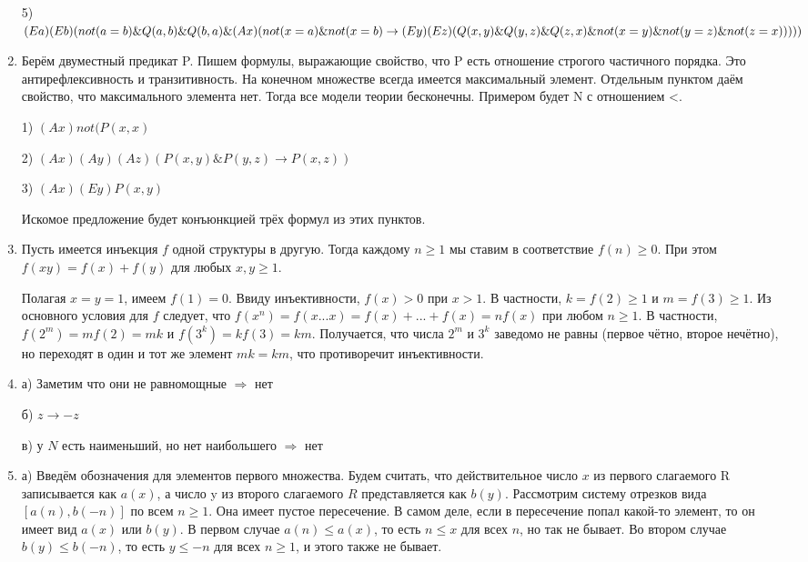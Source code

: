 \documentclass[11pt]{article}
\begin{document}
\begin{enumerate}
		5) $(Ea)(Eb)(not(a=b) \& Q(a,b) \& Q(b,a) \& (Ax)(not(x=a)\& not(x=b) \to \\ (Ey)(Ez)(Q(x,y)\& Q(y,z)\& Q(z,x)\& not(x=y)\& not(y=z)\& not(z=x)))))$
		
		\item Берём двуместный предикат P. Пишем формулы, выражающие свойство, что P есть отношение строгого частичного порядка. Это антирефлексивность и транзитивность. На конечном множестве всегда имеется максимальный элемент. Отдельным пунктом даём свойство, что максимального элемента нет. Тогда все модели теории бесконечны. Примером будет N с отношением <.
		
		1) $(Ax)not(P(x,x)$
		
		2) $(Ax)(Ay)(Az)(P(x,y)\& P(y,z)\to P(x,z))$
		
		3) $(Ax)(Ey)P(x,y)$
		
		Искомое предложение будет конъюнкцией трёх формул из этих пунктов.
		
		\item Пусть имеется инъекция $f$ одной структуры в другую. Тогда каждому $n\ge 1$ мы ставим в соответствие $f(n)\ge 0$. При этом $f(xy)=f(x)+f(y)$ для любых $x,y\ge 1$.
		
		Полагая $x=y=1$, имеем $f(1)=0$. Ввиду инъективности, $f(x) > 0$ при $x > 1$. В частности, $k=f(2)\ge 1$ и $m=f(3)\ge 1$. Из основного условия для $f$ следует, что $f(x^n)=f(x...x)=f(x)+...+f(x)=nf(x)$ при любом $n\ge1$. В частности, $f(2^m)=mf(2)=mk$ и $f(3^k)=kf(3)=km$. Получается, что числа $2^m$ и $3^k$ заведомо не равны (первое чётно, второе нечётно), но переходят в один и тот же элемент $mk=km$, что противоречит инъективности.
		
		\item а) Заметим что они не равномощные $\Rightarrow$ нет
		
		б) $z \to -z$
		
		в) у $N$ есть наименьший, но нет наибольшего $\Rightarrow$ нет
		
		\item а) Введём обозначения для элементов первого множества. Будем считать, что действительное число $x$ из первого слагаемого R записывается как $a(x)$, а число y из второго слагаемого $R$ представляется как $b(y)$. Рассмотрим систему отрезков вида $[a(n),b(-n)]$ по всем $n\ge 1$. Она имеет пустое пересечение. В самом деле, если в пересечение попал какой-то элемент, то он имеет вид $a(x)$ или $b(y)$. В первом случае $a(n)\le a(x)$, то есть $n\le x$ для всех $n$, но так не бывает. Во втором случае $b(y)\le b(-n)$, то есть $y\le -n$ для всех $n\ge 1$, и этого также не бывает.
		

\end{enumerate}
\end{document}

